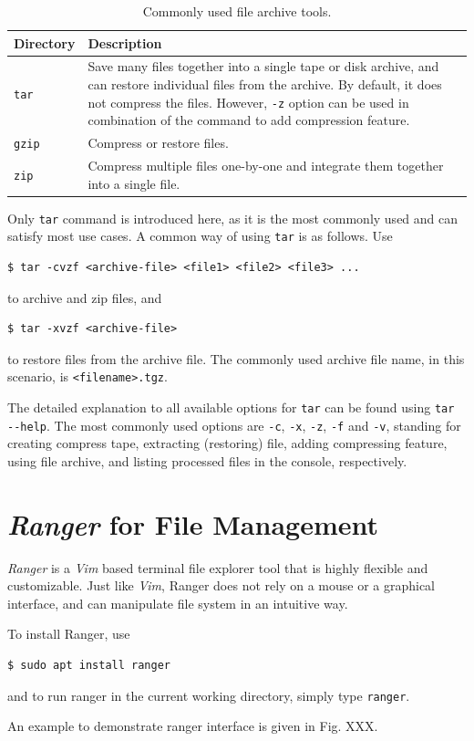 \begin{table}
	\centering \caption{Commonly used file archive tools.}\label{ch:fm:tab:filearchivetools}
	\begin{tabularx}{\textwidth}{lX}
		\hline
		Directory & Description \\ \hline
		\verb|tar| & Save many files together into a single tape or disk archive, and can
		restore individual files from the archive. By default, it does not compress the files. However, \verb|-z| option can be used in combination of the command to add compression feature. \\ 
		\verb|gzip| & Compress or restore files. \\ 
		\verb|zip| & Compress multiple files one-by-one and integrate them together into a single file. \\
		\hline
	\end{tabularx}
\end{table}

Only \verb|tar| command is introduced here, as it is the most commonly used and can satisfy most use cases. A common way of using \verb|tar| is as follows. Use
\begin{lstlisting}
$ tar -cvzf <archive-file> <file1> <file2> <file3> ...
\end{lstlisting}
to archive and zip files, and
\begin{lstlisting}
$ tar -xvzf <archive-file>
\end{lstlisting}
to restore files from the archive file. The commonly used archive file name, in this scenario, is \verb|<filename>.tgz|.

The detailed explanation to all available options for \verb|tar| can be found using \verb|tar --help|. The most commonly used options are \verb|-c|, \verb|-x|, \verb|-z|, \verb|-f| and \verb|-v|, standing for creating compress tape, extracting (restoring) file, adding compressing feature, using file archive, and listing processed files in the console, respectively.

\section{\textit{Ranger} for File Management}

\textit{Ranger} is a \textit{Vim} based terminal file explorer tool that is highly flexible and customizable. Just like \textit{Vim}, Ranger does not rely on a mouse or a graphical interface, and can manipulate file system in an intuitive way.

To install Ranger, use
\begin{lstlisting}
$ sudo apt install ranger
\end{lstlisting}
and to run ranger in the current working directory, simply type \verb|ranger|.

An example to demonstrate ranger interface is given in Fig. XXX.
















